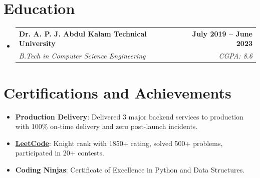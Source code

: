 \documentclass[letterpaper,11pt]{article}
\makeatletter
\newcommand{\resumeItem}[1]{
  \item\small{
    {#1 \vspace{-2pt}}
  }
}
\newcommand{\resumeSubheading}[4]{
  \vspace{-2pt}\item
    \begin{tabular*}{1.0\textwidth}[t]{l@{\extracolsep{\fill}}r}
      \textbf{#1} & \textbf{\small #2} \\
      \textit{\small#3} & \textit{\small #4} \\
    \end{tabular*}\vspace{-7pt}
}
\newcommand{\resumeSubHeadingListStart}{\begin{itemize}[leftmargin=0.0in, label={}]}
\newcommand{\resumeSubHeadingListEnd}{\end{itemize}}
\makeatother
\begin{document}
\section{Education}
\resumeSubHeadingListStart
  \resumeSubheading
    {Dr. A. P. J. Abdul Kalam Technical University}{July 2019 -- June 2023}
    {B.Tech in Computer Science Engineering}{CGPA: 8.6}
\resumeSubHeadingListEnd


\section{Certifications and Achievements}
    \resumeSubHeadingListStart
        \resumeItem{\textbf{Production Delivery}: Delivered 3 major backend services to production with 100\% on-time delivery and zero post-launch incidents.}
        \resumeItem{\textbf{\href{https://leetcode.com/u/mritunjaypratapsinghh/}{LeetCode}}: Knight rank with 1850+ rating, solved 500+ problems, participated in 20+ contests.}
        \resumeItem{\textbf{Coding Ninjas}: Certificate of Excellence in Python and Data Structures.}
    \resumeSubHeadingListEnd
\vspace{-10pt}










        
   
\end{document}
